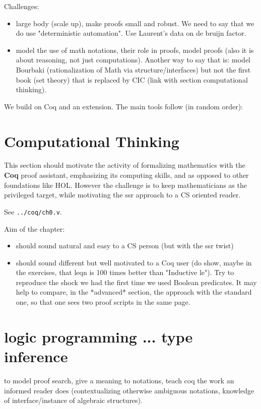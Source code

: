 Challenges:
\begin{itemize}
\item large body (scale up), make proofs small and robust.
	We need to say that we do use "deterministic automation".
	Use Laurent's data on de bruijn factor.
\item model the use of math notations, their role in proofs, model proofs (also
	it is about reasoning, not just computations). Another way to say that
	is: model Bourbaki (rationalization of Math via structure/interfaces)
	but not the first book (set theory) that is replaced by CIC (link with
	section computational thinking).
\end{itemize}

We build on Coq and an extension.  The main tools follow (in random order):

\section{Computational Thinking}\label{ch:compthink}

This section should motivate the activity of formalizing mathematics
with the {\bf Coq} proof assistant, emphasizing its computing skills,
and as opposed to other foundations like HOL. However the challenge is
to keep mathematicians as the privileged target, while motivating the
ssr approach to a CS oriented reader.

See \verb+../coq/ch0.v+.

Aim of the chapter:
\begin{itemize}
\item should sound natural and easy to a CS person (but with the ssr twist)
\item should sound different but well motivated to a Coq user (do show, maybe in
  the exercises, that leqn is 100 times better than "Inductive le").  Try to
  reproduce the shock we had the first time we used Boolean predicates.  It may
  help to compare, in the *advanced* section, the approach with the standard
  one, so that one sees two proof scripts in the same page.
\end{itemize}

\section{logic programming ... type inference}
to model proof search, give a meaning to notations, teach coq the
work an informed reader does (contextualizing otherwise ambiguous
notations, knowledge of interface/instance of algebraic structures).

